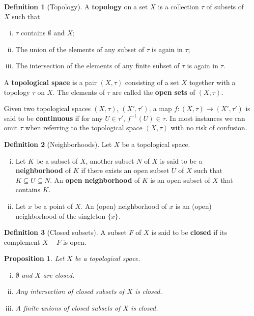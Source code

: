 \documentclass[a4paper,12pt,parskip=half*,chapterprefix=true,numbers=noendperiod]{scrreprt}
\newtheorem{proposition}{Proposition}[section]
\theoremstyle{definition}
\newtheorem{definition}{Definition}[section]
\theoremstyle{remark}
\begin{document}
\begin{definition}[Topology]
A \textbf{topology} on a set $X$ is a collection $\tau$ of subsets of $X$ such that
\begin{enumerate}[(i)]
	\item $\tau$ contains $\emptyset$ and $X$;
	\item The union of the elements of any subset of $\tau$ is again in $\tau$;
	\item The intersection of the elements of any finite subset of $\tau$ is again in $\tau$.
\end{enumerate}
A \textbf{topological space} is a pair $(X,\tau)$ consisting of a set $X$ together with a topology $\tau$ on $X$. The elements of $\tau$ are called the \textbf{open sets} of $(X,\tau)$.

Given two topological spaces $(X,\tau)$, $(X',\tau')$, a map $f:(X,\tau)\to(X',\tau')$ is said to be \textbf{continuous} if for any $U\in\tau'$, $f^{-1}(U)\in\tau$. In most instances we can omit $\tau$ when referring to the topological space $(X,\tau)$ with no risk of confusion.
\end{definition}

\begin{definition}[Neighborhoods]
	Let $X$ be a topological space.
	\begin{enumerate}[(i)]
		\item Let $K$ be a subset of $X$, another subset $N$ of $X$ is said to be a \textbf{neighborhood} of $K$ if there exists an open subset $U$ of $X$ such that $K\subseteq U\subseteq N$. An \textbf{open neighborhood} of $K$ is an open subset of $X$ that contains $K$.
		\item Let $x$ be a point of $X$. An (open) neighborhood of $x$ is an (open) neighborhood of the singleton $\{x\}$.
	\end{enumerate}	
\end{definition}

\begin{definition}[Closed subsets]
A subset $F$ of $X$ is said to be \textbf{closed} if its complement $X-F$ is open.
\end{definition}

\begin{proposition}
Let $X$ be a topological space.
\begin{enumerate}[(i)]
	\item $\emptyset$ and $X$ are closed.
	\item Any intersection of closed subsets of $X$ is closed.
	\item A finite unions of closed subsets of $X$ is closed.
\end{enumerate}
\end{proposition}
\end{document}
